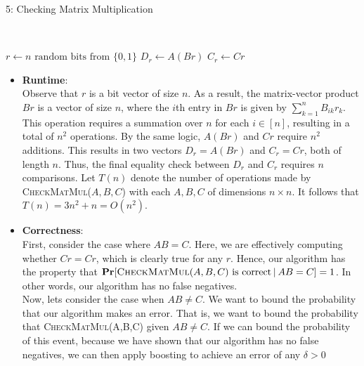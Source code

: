 \documentclass[12pt]{article}
\begin{document}
\begin{solution}
\begin{solution}
\end{solution}

\begin{problem}{5: Checking Matrix Multiplication}
\end{problem}

\begin{solution} \ \\
    
\begin{answerbox}
\begin{algorithmic}
\State $r \gets \text{$n$ random bits from $\{0,1\}$}$
\State $D_r \gets A(Br)$
\State $C_r \gets Cr$
\State {}
\EndProcedure
\end{algorithmic}
\end{answerbox}

\begin{itemize}
    \item \textbf{Runtime}: \\
    Observe that $r$ is a bit vector of size $n$. As a result, the matrix-vector product $Br$ is a vector of size $n$, where the $i$th entry in $Br$ is given by $\sum\limits_{k=1}^n B_{ik}r_k$. This operation requires a summation over $n$ for each $i \in [n]$, resulting in a total of $n^2$ operations. By the same logic, $A(Br)$ and $Cr$ require $n^2$ additions. This results in two vectors $D_r = A(Br)$ and $C_r = Cr$, both of length $n$. Thus, the final equality check between $D_r$ and $C_r$ requires $n$ comparisons. Let $T(n)$ denote the number of operations made by \textsc{CheckMatMul}($A, B, C$) with each $A,B,C$ of dimensions $n \times n$. It follows that $T(n) = 3n^2 + n = O(n^2)$.
    \item \textbf{Correctness}: \\
    First, consider the case where $AB = C$. Here, we are effectively computing whether $Cr = Cr$, which is clearly true for any $r$. Hence, our algorithm has the property that $\textbf{Pr}[\textsc{CheckMatMul}(A,B,C) \text{ is correct} \hspace{2pt}|\hspace{2pt} AB = C] = 1$. In other words, our algorithm has no false negatives. \\
    
    Now, lets consider the case when $AB \neq C$. We want to bound the probability that our algorithm makes an error. That is, we want to bound the probability that \textsc{CheckMatMul}(A,B,C)  given $AB \neq C$. If we can bound the probability of this event, because we have shown that our algorithm has no false negatives, we can then apply boosting to achieve an error of any $\delta > 0$ 



\end{itemize}
\end{solution}
\end{solution}
\end{document}
